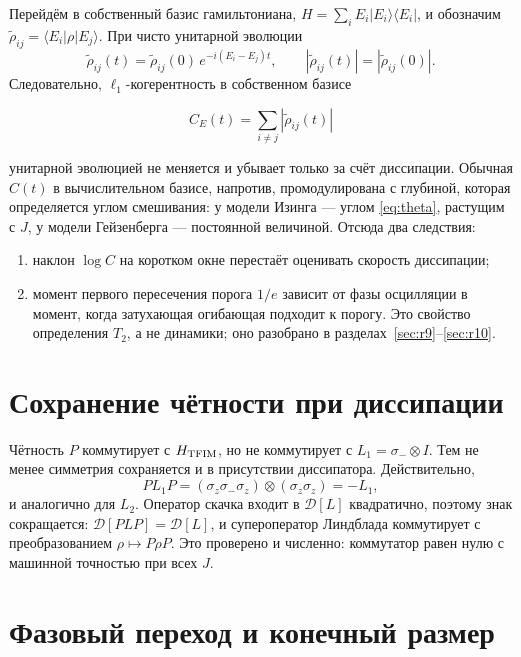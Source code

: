 \documentclass[12pt,a4paper]{report}
\numberwithin{equation}{chapter}
\newcommand{\ket}[1]{|#1\rangle}
\newcommand{\bra}[1]{\langle #1|}
\begin{document}
Перейдём в собственный базис гамильтониана, $H=\sum_iE_i\ket{E_i}\bra{E_i}$, и
обозначим $\tilde\rho_{ij}=\bra{E_i}\rho\ket{E_j}$. При чисто унитарной
эволюции
\begin{equation}
\tilde\rho_{ij}(t)=\tilde\rho_{ij}(0)\,e^{-i(E_i-E_j)t},\qquad
|\tilde\rho_{ij}(t)|=|\tilde\rho_{ij}(0)| .
\end{equation}
Следовательно, $\ell_1$-когерентность в собственном базисе
\begin{keybox}
\begin{equation}
C_E(t)=\sum_{i\neq j}|\tilde\rho_{ij}(t)|
\label{eq:CE}
\end{equation}
\end{keybox}
унитарной эволюцией не меняется и убывает только за счёт диссипации. Обычная
$C(t)$ в вычислительном базисе, напротив, промодулирована с глубиной, которая
определяется углом смешивания: у модели Изинга --- углом \eqref{eq:theta},
растущим с $J$, у модели Гейзенберга --- постоянной величиной. Отсюда два
следствия:
\begin{enumerate}
\item наклон $\log C$ на коротком окне перестаёт оценивать скорость
      диссипации;
\item момент первого пересечения порога $1/e$ зависит от фазы осцилляции в
      момент, когда затухающая огибающая подходит к порогу. Это свойство
      определения $T_2$, а не динамики; оно разобрано в
      разделах~\ref{sec:r9}--\ref{sec:r10}.
\end{enumerate}

\section{Сохранение чётности при диссипации}

Чётность $P$ коммутирует с $H_{\rm TFIM}$, но не коммутирует с
$L_1=\sigma_-\otimes I$. Тем не менее симметрия сохраняется и в присутствии
диссипатора. Действительно,
\[
PL_1P=(\sigma_z\sigma_-\sigma_z)\otimes(\sigma_z\sigma_z)=-L_1,
\]
и аналогично для $L_2$. Оператор скачка входит в $\mathcal D[L]$ квадратично, поэтому знак
сокращается: $\mathcal D[PLP]=\mathcal D[L]$, и супероператор Линдблада
коммутирует с преобразованием $\rho\mapsto P\rho P$. Это проверено и
численно: коммутатор равен нулю с машинной точностью при всех $J$.

\section{Фазовый переход и конечный размер}
\end{document}
